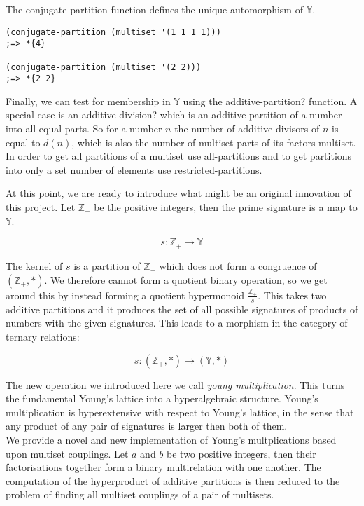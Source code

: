 \documentclass[a4paper,11pt]{report}
\begin{document}
The conjugate-partition function defines the unique automorphism of $\mathbb{Y}$.

\lstset {language=Lisp}
\begin{lstlisting}
(conjugate-partition (multiset '(1 1 1 1)))
;=> *{4}

(conjugate-partition (multiset '(2 2)))
;=> *{2 2}
\end{lstlisting}

Finally, we can test for membership in $\mathbb{Y}$ using the additive-partition? function. A special case is an additive-division? which is an additive partition of a number into all equal parts. So for a number $n$ the number of additive divisors of $n$ is equal to $d(n)$, which is also the number-of-multiset-parts of its factors multiset. In order to get all partitions of a multiset use all-partitions and to get partitions into only a set number of elements use restricted-partitions.

\newpage 

At this point, we are ready to introduce what might be an original innovation of this project. Let $\mathbb{Z}_+$ be the positive integers, then the prime signature is a map to $\mathbb{Y}$.

\[ s : \mathbb{Z}_+ \to \mathbb{Y} \]

The kernel of $s$ is a partition of $\mathbb{Z}_+$ which does not form a congruence of $(\mathbb{Z}_+,*)$. We therefore cannot form a quotient binary operation, so we get around this by instead forming a quotient hypermonoid $\frac{\mathbb{Z}_+}{s}$. This takes two additive partitions and it produces the set of all possible signatures of products of numbers with the given signatures. This leads to a morphism in the category of ternary relations:

\[ s : (\mathbb{Z}_+,*) \to (\mathbb{Y},*) \]

The new operation we introduced here we call \textit{ young multiplication}. This turns the fundamental Young's lattice into a hyperalgebraic structure. Young's multiplication is hyperextensive with respect to Young's lattice, in the sense that any product of any pair of signatures is larger then both of them. \\ 

We provide a novel and new implementation of Young's multplications based upon multiset couplings. Let $a$ and $b$ be two positive integers, then their factorisations together form a binary multirelation with one another. The computation of the hyperproduct of additive partitions is then reduced to the problem of finding all multiset couplings of a pair of multisets.
\end{document}
